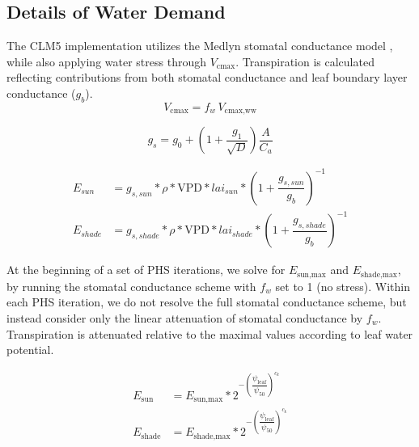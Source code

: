 \documentclass[draft,linenumbers]{agujournal}
\begin{document}
\subsection{Details of Water Demand}

The CLM5 implementation utilizes the Medlyn stomatal conductance model \citep{medlyn2011}, while also applying water stress through $V_{\text{cmax}}$.
Transpiration is calculated reflecting contributions from both stomatal conductance and leaf boundary layer conductance ($g_b$).
    \begin{equation}
    \label{suppeq:vc}
    V_{\text{cmax}} = f_w\, V_{\text{cmax,ww}} 
    \end{equation}
    
    \begin{equation}
    \label{suppeq:gs}
    g_s=g_0+\left(1+\dfrac{g_1}{\sqrt{D}}\right)\dfrac{A}{C_a}
    \end{equation}
    
    \begin{equation}
    \begin{aligned}
    \label{suppeq:e1}
    E_{sun} &=   g_{s,sun}*\rho*\text{VPD}*lai_{sun}*\left(1+\dfrac{g_{s,sun}}{g_b}\right)^{-1} \\
    E_{shade} &=   g_{s,shade}*\rho*\text{VPD}*lai_{shade}*\left(1+\dfrac{g_{s,shade}}{g_b}\right)^{-1}
    \end{aligned}
    \end{equation}

At the beginning of a set of PHS iterations, we solve for $E_{\text{sun,max}}$ and $E_{\text{shade,max}}$, 
by running the stomatal conductance scheme with $f_w$ set to 1 (no stress).
Within each PHS iteration, we do not resolve the full stomatal conductance scheme, 
but instead consider only the linear attenuation of stomatal conductance by $f_w$.
Transpiration is attenuated relative to the maximal values according to leaf water potential.

    \begin{equation}
    \begin{aligned}
    \label{suppeq:e2}
    E_{\text{sun}} &=   E_{\text{sun,max}}*2^{-\left(\dfrac{\psi_{\text{leaf}}}{\psi_{50}}\right)^{c_k}} \\
    E_{\text{shade}} &=   E_{\text{shade,max}}*2^{-\left(\dfrac{\psi_{\text{leaf}}}{\psi_{50}}\right)^{c_k}}
    \end{aligned}
    \end{equation}
    
\end{document}

